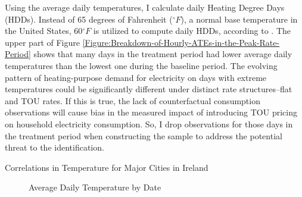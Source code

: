 Using the average daily temperatures, I calculate daily Heating Degree Days (HDDs). Instead of 65 degrees of Fahrenheit ($^{\circ}F$), a normal base temperature in the United States, 60$^{\circ}F$ is utilized to compute daily HDDs, according to \cite{The-Impacts-of-Climate-Change-on-Domestic-Natural-Gas-Consumption-in-the-Greater-Dublin-Region_Liu-and-Sweeney_2012}. The upper part of Figure \ref{Figure:Breakdown-of-Hourly-ATEs-in-the-Peak-Rate-Period} shows that many days in the treatment period had lower average daily temperatures than the lowest one during the baseline period. The evolving pattern of heating-purpose demand for electricity on days with extreme temperatures could be significantly different under distinct rate structures--flat and TOU rates. If this is true, the lack of counterfactual consumption observations will cause bias in the measured impact of introducing TOU pricing on household electricity consumption. So, I drop observations for those days in the treatment period when constructing the sample to address the potential threat to the identification. 

\begin{table}
\caption{Correlations in Temperature for Major Cities in Ireland}
\label{Table:Correlations-in-Temperature-for-Major-Cities-in-Ireland}
\end{table} 
 
\begin{figure}
\caption{Average Daily Temperature by Date}
\label{Figure:Average-Daily-Temperature-by-Date}
\end{figure}
